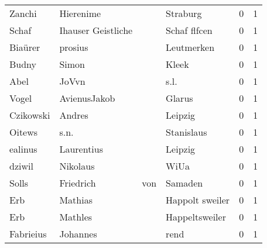 \begin{center}
\begin{tiny}
\begin{longtabu}{llllrr}
                   Zanchi &                          Hierenime &             &                                    Straburg &          0 &         1 \\
                    Schaf &                 Ihauser Geistliche &             &                                Schaf flfcen &          0 &         1 \\
                  Biaürer &                            prosius &             &                                  Leutmerken &          0 &         1 \\
                    Budny &                              Simon &             &                                       Kleek &          0 &         1 \\
                     Abel &                              JoVvn &             &                                        s.l. &          0 &         1 \\
                    Vogel &                       AvienusJakob &             &                                      Glarus &          0 &         1 \\
                Czikowski &                             Andres &             &                                     Leipzig &          0 &         1 \\
                   Oitews &                               s.n. &             &                                  Stanislaus &          0 &         1 \\
                  ealinus &                         Laurentius &             &                                     Leipzig &          0 &         1 \\
                   dziwil &                           Nikolaus &             &                                        WiUa &          0 &         1 \\
                    Solls &                          Friedrich &         von &                                     Samaden &          0 &         1 \\
                      Erb &                            Mathias &             &                             Happolt sweiler &          0 &         1 \\
                      Erb &                            Mathles &             &                              Happeltsweiler &          0 &         1 \\
                Fabrieius &                           Johannes &             &                                        rend &          0 &         1 \\

\end{longtabu}
\end{tiny}
\end{center}
